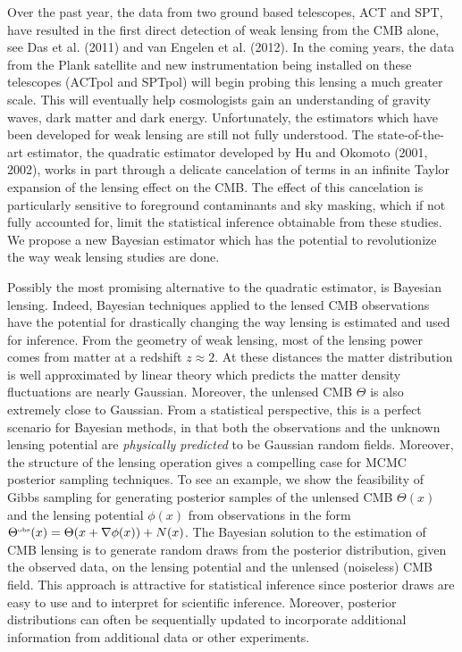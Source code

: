 \documentclass[noinfoline]{imsart}
\begin{document}
 Over the past year, the data from two ground based telescopes, ACT and SPT, have resulted in the first direct detection of weak lensing from the CMB alone, see Das et al. (2011) and van Engelen  et al. (2012). In the coming years, the data from the Plank satellite and  new instrumentation being installed on these telescopes (ACTpol and SPTpol) will begin probing this lensing a much greater scale. This will eventually help cosmologists gain an understanding of gravity waves,  dark matter and dark energy. Unfortunately, the estimators which have been developed for weak lensing are still not fully understood. The state-of-the-art estimator, the quadratic estimator developed by Hu and Okomoto (2001, 2002), works in part through a delicate cancelation of terms in an infinite Taylor expansion of the lensing effect on the CMB. The effect of this cancelation is particularly sensitive to foreground contaminants and sky masking, which  if not fully accounted for,  limit  the statistical inference obtainable from these studies. We propose a  new Bayesian estimator which has the potential to revolutionize the way weak lensing studies are done.  
  


Possibly the most promising alternative to the quadratic estimator, is Bayesian lensing. Indeed, Bayesian techniques applied to the lensed CMB observations have the potential for drastically changing the way lensing is estimated and used for inference. From the geometry of weak lensing, most of the lensing power comes from matter at a redshift $z\approx 2$. At these distances the matter distribution is well approximated by linear theory which predicts the matter density fluctuations are nearly Gaussian. Moreover, the unlensed CMB $\Theta$ is also extremely close to Gaussian.  From a statistical perspective, this is a perfect scenario for Bayesian methods, in that both the observations and the unknown lensing potential are {\em physically predicted} to be Gaussian random fields. 
 Moreover, the structure of the lensing operation gives a compelling case for MCMC posterior sampling techniques.
 To see an example, we show the feasibility of Gibbs sampling for generating posterior samples of the unlensed CMB $\Theta(x)$  and the lensing potential $\phi(x)$ from observations in the form $\Theta^\text{\tiny obs}(x) = \Theta(x+\nabla \phi(x))+ N(x)$.  
The Bayesian solution to the estimation of CMB lensing  is to generate random draws from the posterior distribution, given the observed data, on the lensing potential and the unlensed (noiseless) CMB field. This approach is attractive for statistical inference since posterior draws are easy to use and to interpret for scientific inference. Moreover, posterior distributions can often be sequentially updated to incorporate additional information from additional data or other experiments.
\end{document}
